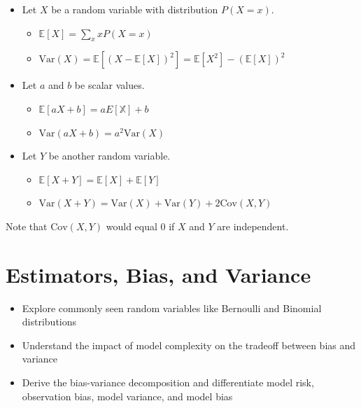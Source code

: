 \documentclass[
  letterpaper,
  DIV=11,
  numbers=noendperiod]{scrreprt}
\providecommand{\tightlist}{%
  \setlength{\itemsep}{0pt}\setlength{\parskip}{0pt}}\usepackage{longtable,booktabs,array}
\begin{document}
\begin{itemize}
\tightlist
\item
  Let \(X\) be a random variable with distribution \(P(X=x)\).

  \begin{itemize}
  \tightlist
  \item
    \(\mathbb{E}[X] = \sum_{x} x P(X=x)\)
  \item
    \(\text{Var}(X) = \mathbb{E}[(X-\mathbb{E}[X])^2] = \mathbb{E}[X^2] - (\mathbb{E}[X])^2\)
  \end{itemize}
\item
  Let \(a\) and \(b\) be scalar values.

  \begin{itemize}
  \tightlist
  \item
    \(\mathbb{E}[aX+b] = aE[\mathbb{X}] + b\)
  \item
    \(\text{Var}(aX+b) = a^2 \text{Var}(X)\)
  \end{itemize}
\item
  Let \(Y\) be another random variable.

  \begin{itemize}
  \tightlist
  \item
    \(\mathbb{E}[X+Y] = \mathbb{E}[X] + \mathbb{E}[Y]\)
  \item
    \(\text{Var}(X + Y) = \text{Var}(X) + \text{Var}(Y) + 2\text{Cov}(X,Y)\)
  \end{itemize}
\end{itemize}

Note that \(\text{Cov}(X,Y)\) would equal 0 if \(X\) and \(Y\) are
independent.


\chapter{Estimators, Bias, and
Variance}\label{estimators-bias-and-variance}

\begin{tcolorbox}[enhanced jigsaw, arc=.35mm, left=2mm, toprule=.15mm, leftrule=.75mm, bottomrule=.15mm, colframe=quarto-callout-note-color-frame, rightrule=.15mm, colbacktitle=quarto-callout-note-color!10!white, opacitybacktitle=0.6, coltitle=black, bottomtitle=1mm, colback=white, toptitle=1mm, title=\textcolor{quarto-callout-note-color}{\faInfo}\hspace{0.5em}{Learning Outcomes}, breakable, opacityback=0, titlerule=0mm]

\begin{itemize}
\tightlist
\item
  Explore commonly seen random variables like Bernoulli and Binomial
  distributions
\item
  Understand the impact of model complexity on the tradeoff between bias
  and variance
\item
  Derive the bias-variance decomposition and differentiate model risk,
  observation bias, model variance, and model bias
\end{itemize}

\end{tcolorbox}
\end{document}
